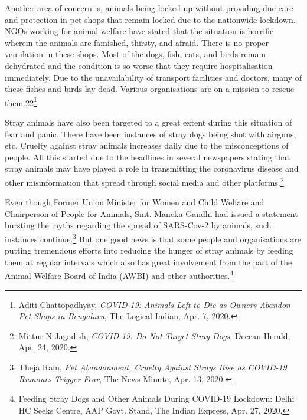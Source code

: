 \begin{multicols}{2}
\noi
Another area of concern is, animals being locked up without providing due care and
protection in pet shops that remain locked due to the nationwide lockdown. NGOs working
for animal welfare have stated that the situation is horrific wherein the animals are famished,
thirsty, and afraid. There is no proper ventilation in these shops. Most of the dogs, fish, cats,
and birds remain dehydrated and the condition is so worse that they require hospitalisation
immediately. Due to the unavailability of transport facilities and doctors, many of these fishes
and birds lay dead. Various organisations are on a mission to rescue them.22\footnote{Aditi Chattopadhyay, \textit{COVID-19: Animals Left to Die as Owners Abandon Pet Shops in Bengaluru}, The Logical Indian, Apr. 7, 2020.}

\noi
Stray animals have also been targeted to a great extent during this situation of fear and panic.
There have been instances of stray dogs being shot with airguns, etc. Cruelty against stray
animals increases daily due to the misconceptions of people. All this started due to the
headlines in several newspapers stating that stray animals may have played a role in
transmitting the coronavirus disease and other misinformation that spread through social
media and other platforms.\footnote{Mittur N Jagadish, \textit{COVID-19: Do Not Target Stray Dogs}, Deccan Herald, Apr. 24, 2020.}

\noi
Even though Former Union Minister for Women and Child Welfare and Chairperson of
People for Animals, Smt. Maneka Gandhi had issued a statement bursting the myths
regarding the spread of SARS-Cov-2 by animals, such instances continue.\footnote{Theja Ram, \textit{Pet Abandonment, Cruelty Against Strays Rise as COVID-19 Rumours Trigger Fear}, The News Minute, Apr. 13, 2020. } But one good
news is that some people and organisations are putting tremendous efforts into reducing the hunger of stray animals by feeding them at regular intervals which also has great involvement
from the part of the Animal Welfare Board of India (AWBI) and other authorities.\footnote{Feeding Stray Dogs and Other Animals During COVID-19 Lockdown: Delhi HC Seeks Centre, AAP Govt. Stand, The Indian Express, Apr. 27, 2020.}




\end{multicols}
